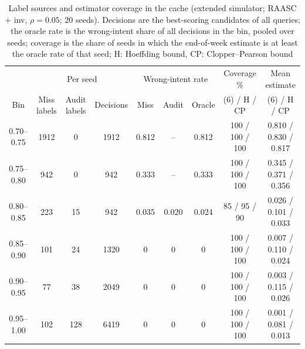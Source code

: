 \documentclass[journal]{IEEEtran}
\begin{document}
\begin{table}[!t]
\caption{Label sources and estimator coverage in the cache (extended simulator; RAASC $+$ inv, $\rho=0.05$; 20 seeds). Decisions are the best-scoring candidates of all queries; the oracle rate is the wrong-intent share of all decisions in the bin, pooled over seeds; coverage is the share of seeds in which the end-of-week estimate is at least the oracle rate of that seed; H: Hoeffding bound, CP: Clopper--Pearson bound}
\label{tab:selection}
\centering\small
\begin{tabular}{ccccccccc}
\toprule
 & \multicolumn{3}{c}{Per seed} & \multicolumn{3}{c}{Wrong-intent rate} & Coverage \% & Mean estimate\\
\cmidrule(lr){2-4}\cmidrule(lr){5-7}
Bin & Miss labels & Audit labels & Decisions & Miss & Audit & Oracle & \multicolumn{1}{c}{(6) / H / CP} & \multicolumn{1}{c}{(6) / H / CP}\\
\midrule
0.70--0.75 & 1912 & 0 & 1912 & 0.812 & -- & 0.812 & 100 / 100 / 100 & 0.810 / 0.830 / 0.817\\
0.75--0.80 & 942 & 0 & 942 & 0.333 & -- & 0.333 & 100 / 100 / 100 & 0.345 / 0.371 / 0.356\\
0.80--0.85 & 223 & 15 & 942 & 0.035 & 0.020 & 0.024 & 85 / 95 / 90 & 0.026 / 0.101 / 0.033\\
0.85--0.90 & 101 & 24 & 1320 & 0 & 0 & 0 & 100 / 100 / 100 & 0.007 / 0.110 / 0.024\\
0.90--0.95 & 77 & 38 & 2049 & 0 & 0 & 0 & 100 / 100 / 100 & 0.003 / 0.115 / 0.026\\
0.95--1.00 & 102 & 128 & 6419 & 0 & 0 & 0 & 100 / 100 / 100 & 0.001 / 0.081 / 0.013\\
\bottomrule
\end{tabular}
\end{table}
\end{document}
